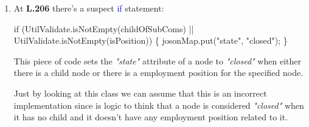 \begin{enumerate}
\item At \textbf{L.206} there's a suspect \textcolor{blue}{if} statement:

	\begin{algorithm}
	\begin{algorithmic}[1]
	\setcounter{ALG@line}{205}

		\State  if (UtilValidate.isNotEmpty(childOfSubComs) ||
		\State\hspace{13em}  UtilValidate.isNotEmpty(isPosition)) \{
		\State\hspace{0.5em}  josonMap.put("state", "closed");
		\State  \}

	\end{algorithmic}
	\end{algorithm}

	This piece of code sets the \textit{"state"} attribute of a node to
	\textit{"closed"} when either there is a child node or there is a employment
	position for the specified node.

	Just by looking at this class we can assume that this is an incorrect
	implementation since is logic to think that a node is considered
	\textit{"closed"} when it has no child and it doesn't have any employment
	position related to it.

\end{enumerate}
